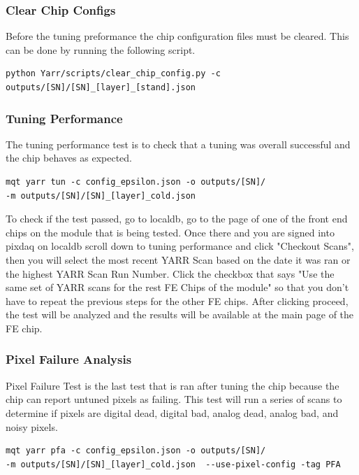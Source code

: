 \documentclass[12pt]{article}
\begin{document}
\subsubsection{Clear Chip Configs}

Before the tuning preformance the chip configuration files must be cleared. This can be done by running the following script. 

\begin{verbatim}
python Yarr/scripts/clear_chip_config.py -c 
outputs/[SN]/[SN]_[layer]_[stand].json
\end{verbatim}

\subsubsection{Tuning Performance}

The tuning performance test is to check that a tuning was overall successful and the chip behaves as expected.

\begin{verbatim}
mqt yarr tun -c config_epsilon.json -o outputs/[SN]/
-m outputs/[SN]/[SN]_[layer]_cold.json 
\end{verbatim}

To check if the test passed, go to localdb, go to the page of one of the front end chips on the module that is being tested. Once there and you are signed into pixdaq on localdb scroll down to tuning performance and click "Checkout Scans", then you will select the most recent YARR Scan based on the date it was ran or the highest YARR Scan Run Number. Click the checkbox that says "Use the same set of YARR scans for the rest FE Chips of the module" so that you don't have to repeat the previous steps for the other FE chips. After clicking proceed, the test will be analyzed and the results will be available at the main page of the FE chip. 

\subsubsection{Pixel Failure Analysis}

Pixel Failure Test is the last test that is ran after tuning the chip because the chip can report untuned pixels as failing. This test will run a series of scans to determine if pixels are digital dead, digital bad, analog dead, analog bad, and noisy pixels.

\begin{verbatim}
mqt yarr pfa -c config_epsilon.json -o outputs/[SN]/
-m outputs/[SN]/[SN]_[layer]_cold.json  --use-pixel-config -tag PFA 
\end{verbatim}
\end{document}

